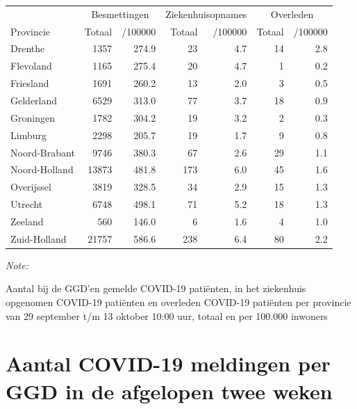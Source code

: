 \documentclass[
  english,
  man,floatsintext]{apa6}
\begin{document}
\begin{table}[H]
\centering
\begin{threeparttable}
\begin{tabular}{lrrrrrr}
\toprule
\multicolumn{1}{c}{ } & \multicolumn{2}{c}{Besmettingen} & \multicolumn{2}{c}{Ziekenhuisopnames} & \multicolumn{2}{c}{Overleden} \\
\cmidrule(l{3pt}r{3pt}){2-3} \cmidrule(l{3pt}r{3pt}){4-5} \cmidrule(l{3pt}r{3pt}){6-7}
Provincie & Totaal & /100000 & Totaal & /100000 & Totaal & /100000\\
\midrule
Drenthe & 1357 & 274.9 & 23 & 4.7 & 14 & 2.8\\
Flevoland & 1165 & 275.4 & 20 & 4.7 & 1 & 0.2\\
Friesland & 1691 & 260.2 & 13 & 2.0 & 3 & 0.5\\
Gelderland & 6529 & 313.0 & 77 & 3.7 & 18 & 0.9\\
Groningen & 1782 & 304.2 & 19 & 3.2 & 2 & 0.3\\
Limburg & 2298 & 205.7 & 19 & 1.7 & 9 & 0.8\\
Noord-Brabant & 9746 & 380.3 & 67 & 2.6 & 29 & 1.1\\
Noord-Holland & 13873 & 481.8 & 173 & 6.0 & 45 & 1.6\\
Overijssel & 3819 & 328.5 & 34 & 2.9 & 15 & 1.3\\
Utrecht & 6748 & 498.1 & 71 & 5.2 & 18 & 1.3\\
Zeeland & 560 & 146.0 & 6 & 1.6 & 4 & 1.0\\
Zuid-Holland & 21757 & 586.6 & 238 & 6.4 & 80 & 2.2\\
\bottomrule
\end{tabular}
\begin{tablenotes}
\item \textit{Note: } 
\item Aantal bij de GGD’en gemelde COVID-19 patiënten, in het ziekenhuis opgenomen COVID-19 patiënten en overleden COVID-19 patiënten per provincie van 29 september t/m 13 oktober 10:00 uur, totaal en per 100.000 inwoners
\end{tablenotes}
\end{threeparttable}
\end{table}

\newpage

\hypertarget{aantal-covid-19-meldingen-per-ggd-in-de-afgelopen-twee-weken}{%
\section{Aantal COVID-19 meldingen per GGD in de afgelopen twee weken}\label{aantal-covid-19-meldingen-per-ggd-in-de-afgelopen-twee-weken}}
\end{document}
